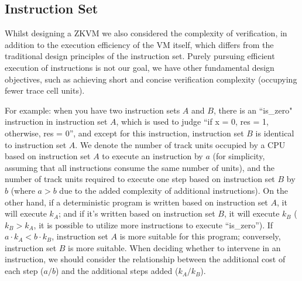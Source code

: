 \subsection{Instruction Set} \label{subsec:instruction-set}

Whilst designing a ZKVM we also considered the complexity of verification, in addition to the execution efficiency of the VM itself, which differs from the traditional design principles of the instruction set. Purely pursuing efficient execution of instructions is not our goal, we have other fundamental design objectives, such as achieving short and concise verification complexity (occupying fewer trace cell units).

For example: when you have two instruction sets $A$ and $B$, there is an ``is\_zero" instruction in instruction set $A$, which is used to judge ``if x = 0, res = 1, otherwise, res = 0”, and except for this instruction, instruction set $B$ is identical to instruction set $A$. We denote the number of track units occupied by a CPU based on instruction set $A$ to execute an instruction by $a$ (for simplicity, assuming that all instructions consume the same number of units), and the number of track units required to execute one step based on instruction set $B$ by $b$ (where $a>b$ due to the added complexity of additional instructions). On the other hand, if a deterministic program is written based on instruction set $A$, it will execute $k_A$; and if it's written based on instruction set $B$, it will execute $k_B$ ($k_B>k_A$, it is possible to utilize more instructions to execute ``is\_zero”). If $a \cdot k_A < b \cdot k_B$, instruction set $A$ is more suitable for this program; conversely, instruction set $B$ is more suitable. When deciding whether to intervene in an instruction, we should consider the relationship between the additional cost of each step ($a/b$) and the additional steps added ($k_A/k_B$).

